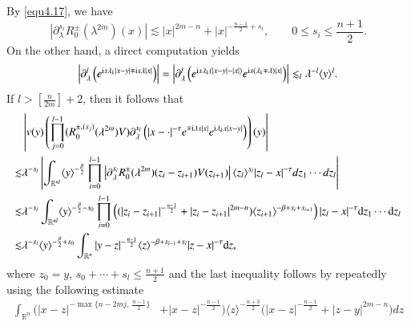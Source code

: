\documentclass[11pt,reqno]{amsart}
\def\R {\mathbb{R}}
\def\d{{\rm d}}
\def\i{{\rm i}}
\numberwithin{equation}{section}
\theoremstyle{definition}
\begin{document}
\begin{appendix}
	By \eqref{equ4.17}, we have
	$$|\partial_{\lambda}^{s_{i}}R_{0}^{\pm}(\lambda^{2m})(x)|\lesssim |x|^{2m-n}+|x|^{-\frac{n-1}{2}+s_i},\qquad 0\le s_i\le \mbox{$\frac{n+1}{2}$}.$$
	On the other hand, a direct computation yields 
	\begin{equation*}\label{equ4.1.2}
		\begin{array}{ll}
			\left|\partial_{\lambda}^{l}\left( e^{ \i s \lambda_{k}|x-y|\mp  \i s \lambda|x|}\right)\right|
			=\left|\partial_{\lambda}^{l}\left( e^{ \i s \lambda_{k}(|x-y|-|x|)} e^{ \i s(\lambda_k\mp\lambda)|x|}\right)\right| \lesssim_{l}\lambda^{-l}\langle y\rangle^{l}.
		\end{array}
	\end{equation*}
	If $l>[\frac{n}{2m}]+2$, then it follows that
	\begin{equation}\label{eq4.5.1.1}
		\begin{split}
			&\left|v(y) \left(\prod_{j=0}^{l-1}(R_{0}^{\pm,(s_{j})}(\lambda^{2m})V)\partial_\lambda^{s_l}\left(|x-\cdot|^{-\tau}e^{\mp \i\lambda s|x|}e^{\i\lambda_{k}s|x-y|}  \right)\right)(y)\right| \\
			\lesssim&
			\lambda^{-s_l}\left| \int_{\R^{nl}}\langle y\rangle^{-\frac{\beta}{2}}\prod_{i=0}^{l-1}\left| \partial_{\lambda}^{s_{i}}R_{0}^{\pm}(\lambda^{2m})( z_{i}-z_{i+1})V(z_{i+1})\right|
			\langle z_l\rangle^{s_l}|z_l-x|^{-\tau}dz_{1}\cdots dz_{l}\right| \\
			\lesssim&
			\lambda^{-s_l}\int_{\R^{nl}}\langle y\rangle^{-\frac{\beta}{2}-s_0}\prod_{i=0}^{l-1}\left( (|z_{i}-z_{i+1}|^{-\frac{n-1}{2}}+|z_{i}-z_{i+1}|^{2m-n})\langle z_{i+1} \rangle^{-\beta+s_{i}+s_{i+1}}\right)
			|z_l-x|^{-\tau}\d z_{1}\cdots \d z_{l}\\
			\lesssim&
			\lambda^{-s_l}\langle y\rangle^{-\frac{\beta}{2}+s_0}\int_{\R^{n}}|y-z|^{-\frac{n-1}{2}}
			\langle z\rangle^{-\beta+s_{l-1}+s_l}|z-x|^{-\tau}\d z,
		\end{split}
	\end{equation}
	where $z_{0}=y$, $s_0+\cdots+s_l\le \frac{n+1}{2}$ and  the last inequality follows by repeatedly using the following estimate
	\begin{equation*}
		\begin{aligned}
			\int_{\R^{n}}\big(|x-z|^{-\max\{n-2mj,\, \frac{n-1}{2}\}}&+|x-z|^{-\frac{n-1}{2}}\big)\langle z\rangle^{-\frac{n+3}{2}}\big(|x-z|^{-\frac{n-1}{2}}+|z-y|^{2m-n}\big)dz\\

\end{aligned}
\end{equation*}
\end{appendix}
\end{document}

